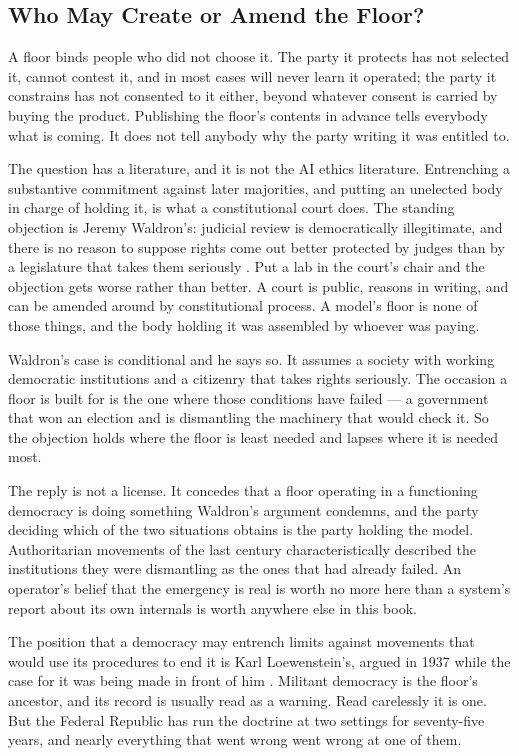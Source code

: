 \subsection{Who May Create or Amend the Floor?}
\label{sec:9.1.1}
A floor binds people who did not choose it. The party it protects has not selected it, cannot contest it, and in most cases will never learn it operated; the party it constrains has not consented to it either, beyond whatever consent is carried by buying the product. Publishing the floor's contents in advance tells everybody what is coming. It does not tell anybody why the party writing it was entitled to.

The question has a literature, and it is not the AI ethics literature. Entrenching a substantive commitment against later majorities, and putting an unelected body in charge of holding it, is what a constitutional court does. The standing objection is Jeremy Waldron's: judicial review is democratically illegitimate, and there is no reason to suppose rights come out better protected by judges than by a legislature that takes them seriously \autocite{waldron2006core}. Put a lab in the court's chair and the objection gets worse rather than better. A court is public, reasons in writing, and can be amended around by constitutional process. A model's floor is none of those things, and the body holding it was assembled by whoever was paying.

Waldron's case is conditional and he says so. It assumes a society with working democratic institutions and a citizenry that takes rights seriously. The occasion a floor is built for is the one where those conditions have failed — a government that won an election and is dismantling the machinery that would check it. So the objection holds where the floor is least needed and lapses where it is needed most.

The reply is not a license. It concedes that a floor operating in a functioning democracy is doing something Waldron's argument condemns, and the party deciding which of the two situations obtains is the party holding the model. Authoritarian movements of the last century characteristically described the institutions they were dismantling as the ones that had already failed. An operator's belief that the emergency is real is worth no more here than a system's report about its own internals is worth anywhere else in this book.

The position that a democracy may entrench limits against movements that would use its procedures to end it is Karl Loewenstein's, argued in 1937 while the case for it was being made in front of him \autocite{loewenstein1937militant}. Militant democracy is the floor's ancestor, and its record is usually read as a warning. Read carelessly it is one. But the Federal Republic has run the doctrine at two settings for seventy-five years, and nearly everything that went wrong went wrong at one of them.

